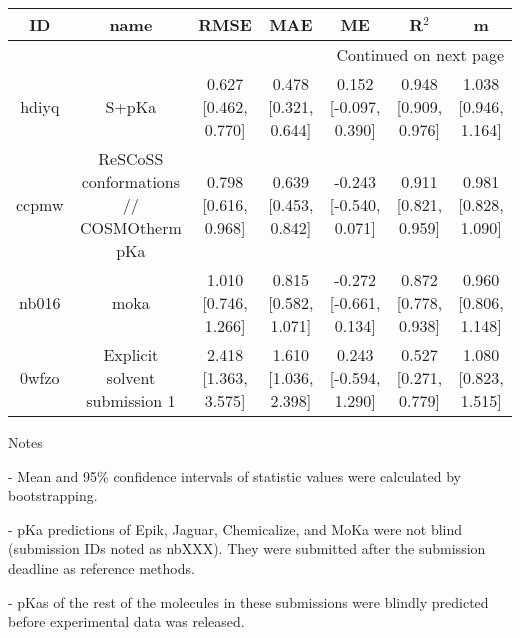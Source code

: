\documentclass{article}
\begin{document}
\begin{center}
\begin{longtable}{|ccccccc|}
\toprule
    ID &                                     name &                  RMSE &                   MAE &                      ME &                 R$^2$ &                     m \\
\midrule
\endhead
\midrule
\multicolumn{7}{r}{{Continued on next page}} \\
\midrule
\endfoot

\bottomrule
\endlastfoot
 hdiyq &                                    S+pKa &  0.627 [0.462, 0.770] &  0.478 [0.321, 0.644] &   0.152 [-0.097, 0.390] &  0.948 [0.909, 0.976] &  1.038 [0.946, 1.164] \\
 ccpmw &  ReSCoSS conformations // COSMOtherm pKa &  0.798 [0.616, 0.968] &  0.639 [0.453, 0.842] &  -0.243 [-0.540, 0.071] &  0.911 [0.821, 0.959] &  0.981 [0.828, 1.090] \\
 nb016 &                                     moka &  1.010 [0.746, 1.266] &  0.815 [0.582, 1.071] &  -0.272 [-0.661, 0.134] &  0.872 [0.778, 0.938] &  0.960 [0.806, 1.148] \\
 0wfzo &            Explicit solvent submission 1 &  2.418 [1.363, 3.575] &  1.610 [1.036, 2.398] &   0.243 [-0.594, 1.290] &  0.527 [0.271, 0.779] &  1.080 [0.823, 1.515] \\
\end{longtable}
\end{center}

Notes

- Mean and 95\% confidence intervals of statistic values were calculated by bootstrapping.

- pKa predictions of Epik, Jaguar, Chemicalize, and MoKa were not blind (submission IDs noted as nbXXX). They were submitted after the submission deadline as reference methods.

- pKas of the rest of the molecules in these submissions were blindly predicted before experimental data was released.
\end{document}
